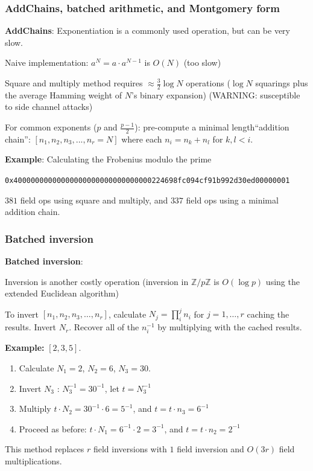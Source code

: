 \documentclass[options]{beamer}
\begin{document}
\begin{frame}[fragile]
    \frametitle{AddChains, batched arithmetic, and Montgomery form}

    {\bf AddChains}: Exponentiation is a commonly used operation, but can be very slow.

    Naive implementation: $a ^ N = a \cdot a^ {N -1}$ is $O(N)$ (too slow)

    Square and multiply method requires $\approx \frac{3}{2} \log N$ operations 
    ($\log N$ squarings plus the average Hamming weight of $N$'s binary expansion)
    (WARNING: susceptible to side channel attacks)

    For common exponents ($p$ and $\frac{p-1}{2}$): pre-compute a minimal length``addition chain'':
    $[n_1, n_2, n_3, ..., n_r = N]$ where each $n_i = n_k + n_l$ for $k, l < i$. 

    {\bf Example}: Calculating the Frobenius modulo the prime
    \begin{small} \verb+0x40000000000000000000000000000000224698fc094cf91b992d30ed00000001+ \end{small}
    $381$ field ops using square and multiply, and $337$ field ops using a minimal addition chain.
\end{frame}

\begin{frame}
    \frametitle{Batched inversion}

    {\bf Batched inversion}:

    Inversion is another costly operation (inversion in $\mathbb{Z}/p\mathbb{Z}$ is $O(\log p)$ using the extended Euclidean algorithm)

    To invert $[n_1, n_2, n_3, \ldots, n_r]$, calculate $N_j = \prod_i^j n_i$ for $j = 1, \ldots, r$ caching the results. Invert $N_r$. Recover all of the $n_i^{-1}$ by multiplying with the cached results. 

    {\bf Example:} $[2, 3, 5]$.
    
    \begin{enumerate}
        \item Calculate $N_1 = 2$, $N_2 = 6$, $N_3 = 30$. 
    
        \item Invert $N_3$ : $N_3^{-1} = 30^{-1}$, let $t = N_3^{-1}$
        
        \item Multiply $t \cdot N_2 = 30^{-1} \cdot 6 = 5^{-1}$, and $t = t \cdot n_3 = 6^{-1}$
        
        \item Proceed as before: $t \cdot N_1 = 6^{-1} \cdot 2 = 3^{-1}$, and $t = t \cdot n_2 = 2^{-1}$
    \end{enumerate}

    This method replaces $r$ field inversions with $1$ field inversion and $O(3r)$ field multiplications. 
\end{frame}
\end{document}
